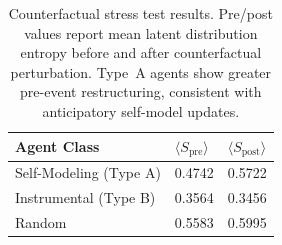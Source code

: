 \begin{table}[t]
\centering
\caption{Counterfactual stress test results. Pre/post values report mean latent
distribution entropy before and after counterfactual perturbation.
Type~A agents show greater pre-event restructuring, consistent with anticipatory
self-model updates.}
\label{tab:counterfactual}
\begin{tabular}{lll}
\toprule
Agent Class & $\langle S_\mathrm{pre}\rangle$ & $\langle S_\mathrm{post}\rangle$ \\
\midrule
Self-Modeling (Type A) & 0.4742 & 0.5722 \\
Instrumental (Type B) & 0.3564 & 0.3456 \\
Random & 0.5583 & 0.5995 \\
\bottomrule
\end{tabular}
\end{table}
